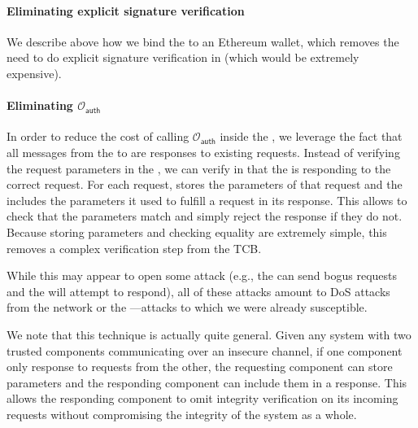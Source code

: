 \paragraph{Eliminating explicit signature verification}

We describe above how we bind the \encname to an Ethereum wallet, which removes the need to do explicit signature verification in \tcont (which would be extremely expensive).

\paragraph{Eliminating $\mathcal{O}_\textsf{auth}$}

In order to reduce the cost of calling $\mathcal{O}_\textsf{auth}$ inside the \encname, we leverage the fact that all messages from the \encname to \tcont are responses to existing requests.
Instead of verifying the request parameters in the \encname, we can verify in \tcont that the \encname is responding to the correct request.
For each request, \tcont stores the parameters of that request and the \encname includes the parameters it used to fulfill a request in its response.
This allows \tcont to check that the parameters match and simply reject the response if they do not.
Because storing parameters and checking equality are extremely simple, this removes a complex verification step from the TCB.

While this may appear to open some attack (e.g., the \medname can send bogus requests and the \encname will attempt to respond),
all of these attacks amount to DoS attacks from the network or the \medname---attacks to which we were already susceptible.

We note that this technique is actually quite general.
Given any system with two trusted components communicating over an insecure channel, if one component only response to requests from the other,
the requesting component can store parameters and the responding component can include them in a response.
This allows the responding component to omit integrity verification on its incoming requests without compromising the integrity of the system as a whole.





